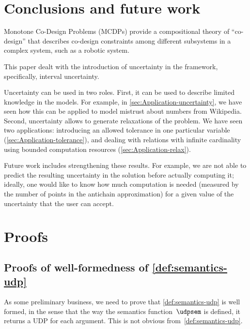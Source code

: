 \section{Conclusions and future work}

Monotone Co-Design Problems (MCDPs) provide a compositional theory
of ``co-design'' that describes co-design constraints among different
subsystems in a complex system, such as a robotic system.

This paper dealt with the introduction of uncertainty in the framework,
specifically, interval uncertainty.

Uncertainty can be used in two roles. First, it can be used to describe
limited knowledge in the models. For example, in \cref{sec:Application-uncertainty},
we have seen how this can be applied to model mistrust about numbers
from Wikipedia. Second, uncertainty allows to generate relaxations
of the problem. We have seen two applications: introducing an allowed
tolerance in one particular variable (\cref{sec:Application-tolerance}),
and dealing with relations with infinite cardinality using bounded
computation resources (\cref{sec:Application-relax}).

Future work includes strengthening these results. For example, we
are not able to predict the resulting uncertainty in the solution
before actually computing it; ideally, one would like to know how
much computation is needed (measured by the number of points in the
antichain approximation) for a given value of the uncertainty that
the user can accept.



\section{Proofs}

\subsection{Proofs of well-formedness of \cref{def:semantics-udp}}

As some preliminary business, we need to prove that \cref{def:semantics-udp}
is well formed, in the sense that the way the semantics function~$\udpsem$
is defined, it returns a UDP for each argument. This is not obvious
from~\cref{def:semantics-udp}.

